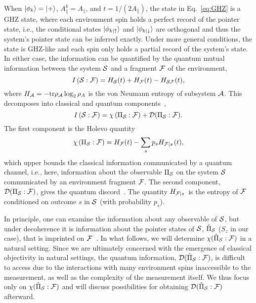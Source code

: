 \documentclass[aps,prl,floatfix,twocolumn,footinbib,superscriptaddress]{revtex4-1}
\begin{document}
When $\ket{\phi_k} = \ket{+}$, $A^k_\parallel=A_\parallel$, and $t=1/(2A_\parallel)$, the state in Eq.~\eqref{eq:GHZ} is a GHZ state, where each environment spin holds a perfect record of the pointer state, i.e., the conditional states $\ket{\phi_{k|\up}}$ and $\ket{\phi_{k|\down}}$ are orthogonal and thus the system's pointer state can be inferred exactly. Under more general conditions, the state is GHZ-like and each spin only holds a partial record of the system's state. In either case, the information can be quantified by the quantum mutual information between the system $\S$ and a fragment $\F$ of the environment, 
\begin{equation} \label{eq:MI}
\MI = \ES + \EF - \ESF ,
\end{equation}
where $H_\A=-\tr \rho_\A \log_2 \rho_A$ is the von Neumann entropy of subsystem $\A$. This decomposes into classical and quantum components~\cite{Zwolak13-1}, 
\begin{equation} \label{eq:QC}
\MI = \Hol + \QD .
\end{equation}
The first component is the Holevo quantity \cite{Holevo73}
\begin{equation}
\Hol = \EF - \sum_{s} p_s \CEF(t) ,
\end{equation}
which upper bounds the classical information communicated by a quantum channel, i.e., here, information about the observable $\Pi_{\S}$ on the system $\S$ communicated by an environment fragment $\F$. The second component, $\QD$, gives the quantum discord~\cite{Zurek00-1,Ollivier02-1,Henderson01-1}. The quantity $\CEF$ is the entropy of $\F$ conditioned on outcome $s$ in $\S$ (with probability $p_s$). 

In principle, one can examine the information about any observable of $\S$, but under decoherence it is information about the pointer states of $\S$, $\PO$ ($S_z$ in our case), that is imprinted on $\F$~\cite{Ollivier04-1,Zwolak13-1}. In what follows, we will determine $\HolpIL$ in a natural setting. Since we are ultimately concerned with the emergence of classical objectivity in natural settings, the quantum information, $\QDpIL$, is difficult to access due to the interactions with many environment spins inaccessible to the measurement, as well as the complexity of the measurement itself. We thus focus only on $\HolpIL$ and will discuss possibilities for obtaining $\QDpIL$ afterward.
\end{document}

